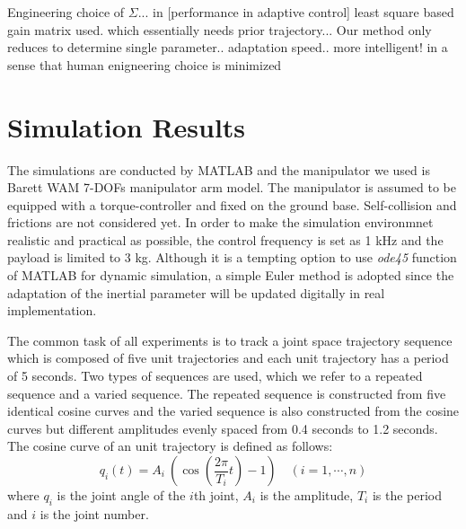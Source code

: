 \documentclass[letterpaper, 10 pt, conference]{ieeeconf}  %
\newtheorem{remark}{Remark}
\begin{document}
Engineering choice of $\Sigma$... in [performance in adaptive control] least square based gain matrix used. which essentially needs prior trajectory... Our method only reduces to determine single parameter.. adaptation speed.. more intelligent! in a sense that human enigneering choice is minimized
\section{Simulation Results}
The simulations are conducted by MATLAB and the manipulator we used is Barett WAM 7-DOFs manipulator arm model. The manipulator is assumed to be equipped with a torque-controller and fixed on the ground base. Self-collision and frictions are not considered yet. In order to make the simulation environmnet realistic and practical as possible, the control frequency is set as 1 kHz and the payload is limited to 3 kg. Although it is a tempting option to use {\it{ode45}} function of MATLAB for dynamic simulation, a simple Euler method is adopted since the adaptation of the inertial parameter will be updated digitally in real implementation.

The common task of all experiments is to track a joint space trajectory sequence which is composed of five unit trajectories and each unit trajectory has a period of 5 seconds. Two types of sequences are used, which we refer to a repeated sequence and a varied sequence. The repeated sequence is constructed from five identical cosine curves and the varied sequence is also constructed from the cosine curves but different amplitudes evenly spaced from 0.4 seconds to 1.2 seconds. The cosine curve of an unit trajectory is defined as follows:
\begin{equation*}
	q_i(t) = A_i~(\cos(\frac{2\pi}{T_i}t)-1)  \quad (i=1,\cdots,n)
\end{equation*}
where $q_i$ is the joint angle of the $i$th joint, $A_i$ is the amplitude,  $T_i$ is the period and $i$ is the joint number.
\end{document}
